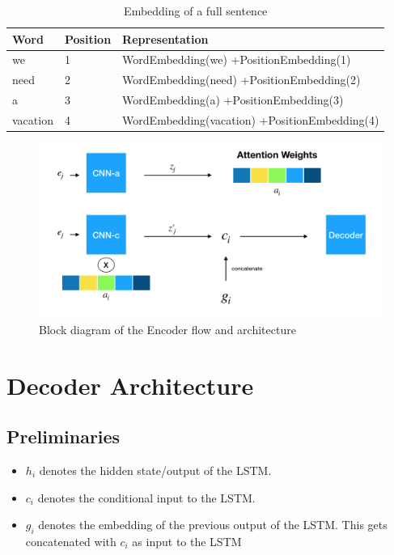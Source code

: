 \documentclass{article}
\begin{document}
\begin{center}
\begin{table}[h]
 \begin{tabu}  { | X[0.8,l] | X[0.8,l] | X[3,l] | }
 \hline
 Word & Position & Representation \\
 \hline
 we & 1 & WordEmbedding(we) +\linebreak PositionEmbedding(1)  \\ 
 \hline
 need & 2 & WordEmbedding(need) +\linebreak PositionEmbedding(2)\\
 \hline
  a & 3 & WordEmbedding(a) +\linebreak PositionEmbedding(3)\\
 \hline
 vacation & 4 & WordEmbedding(vacation) +\linebreak PositionEmbedding(4)\\
 \hline
\end{tabu}
\caption{Embedding of a full sentence}
\label{table:emb}
\end{table}
\end{center}

\begin{figure}[h]
    \centering
	\captionsetup{justification=centering,margin=2cm}
    \includegraphics[scale=0.35]{Encoder_Flow}
    \caption{Block diagram of the Encoder flow and architecture}
    \label{fig:enc}
\end{figure}

\section{Decoder Architecture}
\subsection{Preliminaries}
\begin{itemize}
\item $h_i$ denotes the hidden state/output of the LSTM.
\item $c_i$ denotes the conditional input to the LSTM.
\item $g_i$ denotes the embedding of the previous output of the LSTM. This gets concatenated with $c_i$ as input to the LSTM
\end{itemize}
\end{document}
